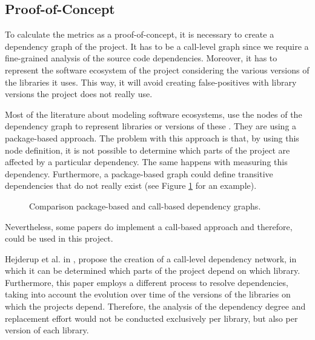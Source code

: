 \subsection{Proof-of-Concept}
To calculate the metrics as a proof-of-concept, it is necessary to create a dependency graph of the project. It has to be a call-level graph since we require a fine-grained analysis of the source code dependencies. Moreover, it has to represent the software ecosystem of the project considering the various versions of the libraries it uses. This way, it will avoid creating false-positives with library versions the project does not really use.

Most of the literature about modeling software ecosystems, use the nodes of the dependency graph to represent libraries or versions of these \cite{decan2017empirical, hejderup2015dependencies, kikas2017structure}. They are using a package-based approach. The problem with this approach is that, by using this node definition, it is not possible to determine which parts of the project are affected by a particular dependency. The same happens with measuring this dependency. Furthermore, a package-based graph could define transitive dependencies that do not really exist (see Figure \ref{fig:example-call-based} for an example).

\begin{figure}[ht!]
    \centering
    \caption{Comparison package-based and call-based dependency graphs.}
    \label{fig:example-call-based}
\end{figure}

\bigskip\noindent
Nevertheless, some papers do implement a call-based approach and therefore, could be used in this project.

Hejderup et al. in \cite{hejderup2018software}, propose the creation of a call-level dependency network, in which it can be determined which parts of the project depend on which library. Furthermore, this paper employs a different process to resolve dependencies, taking into account the evolution over time of the versions of the libraries on which the projects depend. Therefore, the analysis of the dependency degree and replacement effort would not be conducted exclusively per library, but also per version of each library.

